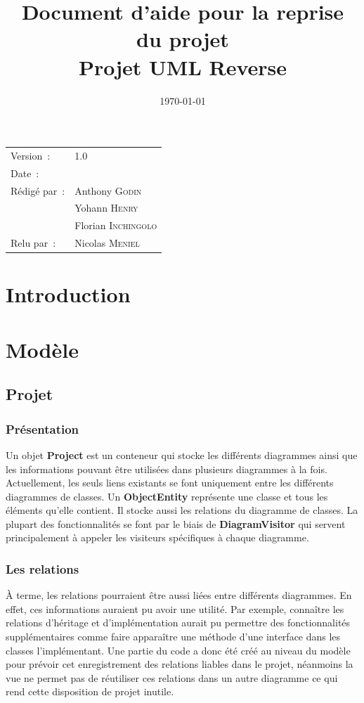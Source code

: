 \documentclass[hidelinks, 10pt,a4paper]{article}
\title{\bfseries Document d'aide pour la reprise du projet\\Projet UML Reverse}
\begin{document}
\maketitle
\begin{center}
\begin{tabular}{ll}
  Version~: & 1.0\\[.5em]
  Date~: & \date{\today}\\[.5em]
  Rédigé par~: & Anthony \textsc{Godin} \\
               & Yohann \textsc{Henry} \\
               & Florian \textsc{Inchingolo} \\[.5em]
  Relu par~:   & Nicolas \textsc{Meniel} \\
\end{tabular}
\end{center}

\newpage
\tableofcontents
\newpage

\section{Introduction}
\section{Modèle}
  \subsection{Projet}
    \subsubsection{Présentation}
   Un objet \textbf{Project} est un conteneur qui stocke les différents diagrammes ainsi que les informations 
   pouvant être utilisées dans plusieurs diagrammes à la fois. 
   Actuellement, les seuls liens existants se font uniquement entre les différents diagrammes de classes. 
   Un \textbf{ObjectEntity} représente une classe et tous les éléments qu'elle contient. Il stocke aussi les relations du diagramme de classes.
   La plupart des fonctionnalités se font par le biais de \textbf{DiagramVisitor} qui servent principalement à appeler les visiteurs spécifiques à chaque diagramme.
   
   \subsubsection{Les relations}
   À terme, les relations pourraient être aussi liées entre différents diagrammes. 
   En effet, ces informations auraient pu avoir une utilité. 
   Par exemple, connaître les relations d'héritage et d'implémentation aurait pu permettre des fonctionnalités supplémentaires
   comme faire apparaître une méthode d'une interface dans les classes l'implémentant.
   Une partie du code a donc été créé au niveau du modèle pour prévoir cet enregistrement des relations liables dans le projet,
   néanmoins la vue ne permet pas de réutiliser ces relations dans un autre diagramme ce qui rend cette disposition de projet inutile.
   
\end{document}
